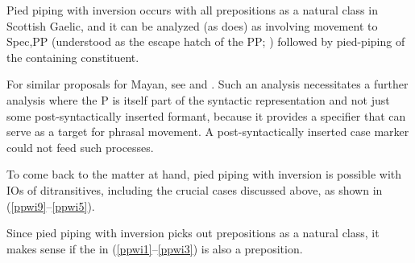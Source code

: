 \documentclass[output=paper,colorlinks,citecolor=brown]{langscibook}
\begin{document}
\noindent Pied piping with inversion occurs with all prepositions as a natural class in Scottish Gaelic, and it can be analyzed (as \citealt{gt:Adger:2022} does) as involving movement to Spec,PP (understood as the escape hatch of the PP; \citealt{gt:Abels:2003c}) followed by pied-piping of the containing constituent. 


\noindent For similar proposals for Mayan, see \citet[90]{gt:Heck:2009} and \citet[186ff]{gt:Cable:2010}. Such an analysis necessitates a further analysis where the P is itself part of the syntactic representation and not just some post-syntactically inserted formant, because it provides a specifier that can serve as a target for phrasal movement. A post-syntactically inserted case marker could not feed such processes. 

To come back to the matter at hand, pied piping with inversion is possible with IOs of ditransitives, including the crucial cases discussed above, as shown in (\ref{ppwi9}--\ref{ppwi5}).  






\noindent Since pied piping with inversion picks out prepositions as a natural class,  it makes sense if the  in (\ref{ppwi1}--\ref{ppwi3}) is also a preposition.
\end{document}
